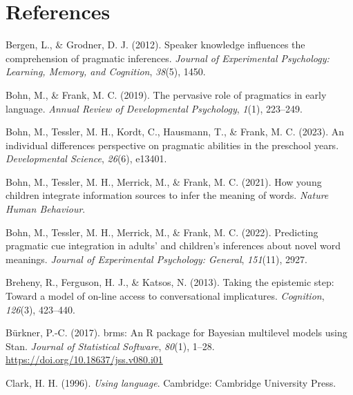 \documentclass[
  man,floatsintext]{apa6}
\newlength{\cslhangindent}
\newlength{\cslentryspacingunit} %
\newenvironment{CSLReferences}[2] %
 {%
  \setlength{\parindent}{0pt}
  \ifodd #1
  \let\oldpar\par
  \def\par{\hangindent=\cslhangindent\oldpar}
  \fi
  \setlength{\parskip}{#2\cslentryspacingunit}
 }%
 {}
\begin{document}
\newpage

\hypertarget{references}{%
\section{References}\label{references}}

\hypertarget{refs}{}
\begin{CSLReferences}{1}{0}
\leavevmode{}%
Bergen, L., \& Grodner, D. J. (2012). Speaker knowledge influences the comprehension of pragmatic inferences. \emph{Journal of Experimental Psychology: Learning, Memory, and Cognition}, \emph{38}(5), 1450.

\leavevmode{}%
Bohn, M., \& Frank, M. C. (2019). The pervasive role of pragmatics in early language. \emph{Annual Review of Developmental Psychology}, \emph{1}(1), 223--249.

\leavevmode{}%
Bohn, M., Tessler, M. H., Kordt, C., Hausmann, T., \& Frank, M. C. (2023). An individual differences perspective on pragmatic abilities in the preschool years. \emph{Developmental Science}, \emph{26}(6), e13401.

\leavevmode{}%
Bohn, M., Tessler, M. H., Merrick, M., \& Frank, M. C. (2021). How young children integrate information sources to infer the meaning of words. \emph{Nature Human Behaviour}.

\leavevmode{}%
Bohn, M., Tessler, M. H., Merrick, M., \& Frank, M. C. (2022). Predicting pragmatic cue integration in adults' and children's inferences about novel word meanings. \emph{Journal of Experimental Psychology: General}, \emph{151}(11), 2927.

\leavevmode{}%
Breheny, R., Ferguson, H. J., \& Katsos, N. (2013). Taking the epistemic step: Toward a model of on-line access to conversational implicatures. \emph{Cognition}, \emph{126}(3), 423--440.

\leavevmode{}%
Bürkner, P.-C. (2017). {brms}: An {R} package for {Bayesian} multilevel models using {Stan}. \emph{Journal of Statistical Software}, \emph{80}(1), 1--28. \url{https://doi.org/10.18637/jss.v080.i01}

\leavevmode{}%
Clark, H. H. (1996). \emph{Using language}. Cambridge: Cambridge University Press.


\end{CSLReferences}
\end{document}
